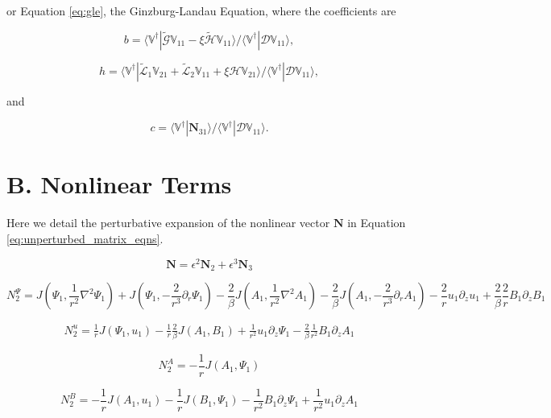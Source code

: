\documentclass{emulateapj}
\newcommand{\beq}{\begin{equation}}
\newcommand{\eeq}{\end{equation}}
\begin{document}
or Equation \ref{eq:gle}, the Ginzburg-Landau Equation, where the coefficients are 

\beq
b = \langle  \mathbb{V}^\dagger | \widetilde{\mathcal{G}} \mathbb{V}_{11} - \xi \widetilde{\mathcal{H}} \mathbb{V}_{11} \rangle / \langle \mathbb{V}^\dagger | \mathcal{D} \mathbb{V}_{11} \rangle,
\eeq

\beq
h = \langle \mathbb{V}^\dagger | \widetilde{\mathcal{L}}_1 \mathbb{V}_{21} + \widetilde{\mathcal{L}}_2 \mathbb{V}_{11} + \xi \mathcal{H} \mathbb{V}_{21} \rangle / \langle \mathbb{V}^\dagger | \mathcal{D} \mathbb{V}_{11} \rangle,
\eeq

and

\beq
c = \langle \mathbb{V}^\dagger | \mathbf{N}_{31} \rangle / \langle \mathbb{V}^\dagger | \mathcal{D} \mathbb{V}_{11} \rangle. 
\eeq

\section{B. Nonlinear Terms}\label{app:nonlinear_terms}

Here we detail the perturbative expansion of the nonlinear vector $\mathbf{N}$ in Equation \ref{eq:unperturbed_matrix_eqns}. 

\beq
\mathbf{N} = \epsilon^2 \mathbf{N}_2 + \epsilon^3 \mathbf{N}_3
\eeq

\beq
N_2^{\Psi}  = J(\Psi_1, \frac{1}{r^2} \nabla^2 \Psi_1) + J(\Psi_1, -\frac{2}{r^3}\partial_r\Psi_1)
- \frac{2}{\beta} J (A_1, \frac{1}{r^2} \nabla^2 A_1) - \frac{2}{\beta} J(A_1, -\frac{2}{r^3} \partial_r A_1) - \frac{2}{r} u_1 \partial_z u_1 + \frac{2}{\beta} \frac{2}{r} B_1 \partial_z B_1
\eeq

\beq
\begin{split}
N_2^{u} = \frac{1}{r} J\left(\Psi_1, u_1\right) - \frac{1}{r} \frac{2}{\beta} J\left(A_1, B_1\right) + \frac{1}{r^2} u_1 \partial_z \Psi_1 - \frac{2}{\beta}\frac{1}{r^2} B_1 \partial_z A_1
\end{split}
\eeq

\beq
N_2^A = -\frac{1}{r} J\left(A_1, \Psi_1\right)
\eeq

\beq
N_2^B = -\frac{1}{r} J\left(A_1, u_1\right) - \frac{1}{r} J\left(B_1, \Psi_1\right) - \frac{1}{r^2} B_1 \partial_z \Psi_1 + \frac{1}{r^2} u_1 \partial_z A_1
\eeq
\end{document}
